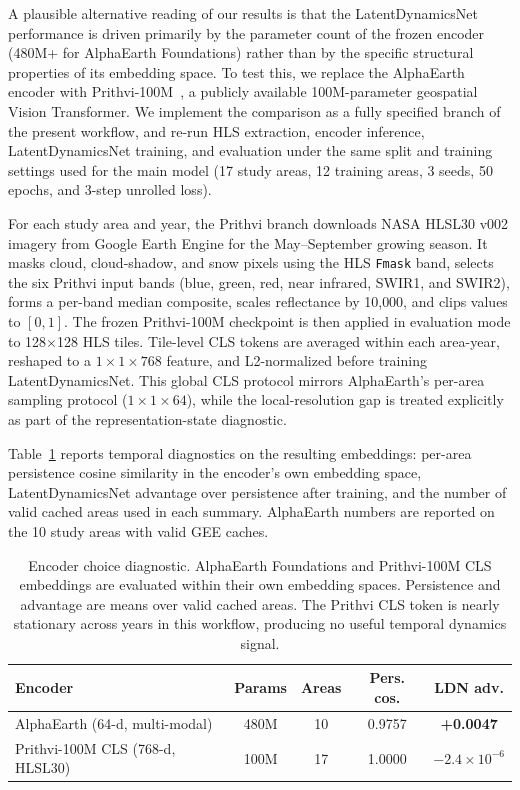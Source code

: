 \documentclass{article}
\begin{document}
A plausible alternative reading of our results is that the LatentDynamicsNet performance is driven primarily by the parameter count of the frozen encoder (480M+ for AlphaEarth Foundations) rather than by the specific structural properties of its embedding space. To test this, we replace the AlphaEarth encoder with Prithvi-100M~\citep{jakubik2024prithvi}, a publicly available 100M-parameter geospatial Vision Transformer. We implement the comparison as a fully specified branch of the present workflow, and re-run HLS extraction, encoder inference, LatentDynamicsNet training, and evaluation under the same split and training settings used for the main model (17 study areas, 12 training areas, 3 seeds, 50 epochs, and 3-step unrolled loss).

For each study area and year, the Prithvi branch downloads NASA HLSL30 v002 imagery from Google Earth Engine for the May--September growing season. It masks cloud, cloud-shadow, and snow pixels using the HLS \texttt{Fmask} band, selects the six Prithvi input bands (blue, green, red, near infrared, SWIR1, and SWIR2), forms a per-band median composite, scales reflectance by 10{,}000, and clips values to $[0,1]$. The frozen Prithvi-100M checkpoint is then applied in evaluation mode to 128$\times$128 HLS tiles. Tile-level CLS tokens are averaged within each area-year, reshaped to a $1 \times 1 \times 768$ feature, and L2-normalized before training LatentDynamicsNet. This global CLS protocol mirrors AlphaEarth's per-area sampling protocol ($1 \times 1 \times 64$), while the local-resolution gap is treated explicitly as part of the representation-state diagnostic.

Table~\ref{tab:encoder_ablation} reports temporal diagnostics on the resulting embeddings: per-area persistence cosine similarity in the encoder's own embedding space, LatentDynamicsNet advantage over persistence after training, and the number of valid cached areas used in each summary. AlphaEarth numbers are reported on the 10 study areas with valid GEE caches.

\begin{table}[htbp]
\centering
\caption{Encoder choice diagnostic. AlphaEarth Foundations and Prithvi-100M CLS embeddings are evaluated within their own embedding spaces. Persistence and advantage are means over valid cached areas. The Prithvi CLS token is nearly stationary across years in this workflow, producing no useful temporal dynamics signal.}
\label{tab:encoder_ablation}
\small
\begin{tabular*}{\textwidth}{@{\extracolsep{\fill}}lcccc@{}}
\toprule
Encoder & Params & Areas & Pers. cos. & LDN adv. \\
\midrule
AlphaEarth (64-d, multi-modal) & 480M & 10 & 0.9757 & \textbf{+0.0047} \\
Prithvi-100M CLS (768-d, HLSL30) & 100M & 17 & 1.0000 & $-2.4 \times 10^{-6}$ \\
\bottomrule
\end{tabular*}
\end{table}
\end{document}
